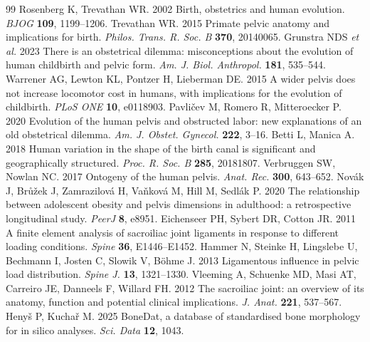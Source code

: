 \documentclass[openacc]{rsproca_new}
\begin{document}
\begin{thebibliography}{99}
 Rosenberg K, Trevathan WR. 2002 Birth, obstetrics and human evolution. \emph{BJOG} \textbf{109}, 1199--1206.
 Trevathan WR. 2015 Primate pelvic anatomy and implications for birth. \emph{Philos. Trans. R. Soc. B} \textbf{370}, 20140065.
 Grunstra NDS \emph{et al.} 2023 There is an obstetrical dilemma: misconceptions about the evolution of human childbirth and pelvic form. \emph{Am. J. Biol. Anthropol.} \textbf{181}, 535--544.
 Warrener AG, Lewton KL, Pontzer H, Lieberman DE. 2015 A wider pelvis does not increase locomotor cost in humans, with implications for the evolution of childbirth. \emph{PLoS ONE} \textbf{10}, e0118903.
 Pavli\v{c}ev M, Romero R, Mitteroecker P. 2020 Evolution of the human pelvis and obstructed labor: new explanations of an old obstetrical dilemma. \emph{Am. J. Obstet. Gynecol.} \textbf{222}, 3--16.
 Betti L, Manica A. 2018 Human variation in the shape of the birth canal is significant and geographically structured. \emph{Proc. R. Soc. B} \textbf{285}, 20181807.
 Verbruggen SW, Nowlan NC. 2017 Ontogeny of the human pelvis. \emph{Anat. Rec.} \textbf{300}, 643--652.
 Nov\'{a}k J, Br\r{u}\v{z}ek J, Zamrazilov\'{a} H, Va\v{n}kov\'{a} M, Hill M, Sedl\'{a}k P. 2020 The relationship between adolescent obesity and pelvis dimensions in adulthood: a retrospective longitudinal study. \emph{PeerJ} \textbf{8}, e8951.
 Eichenseer PH, Sybert DR, Cotton JR. 2011 A finite element analysis of sacroiliac joint ligaments in response to different loading conditions. \emph{Spine} \textbf{36}, E1446--E1452.
 Hammer N, Steinke H, Lingslebe U, Bechmann I, Josten C, Slowik V, B\"ohme J. 2013 Ligamentous influence in pelvic load distribution. \emph{Spine J.} \textbf{13}, 1321--1330.
 Vleeming A, Schuenke MD, Masi AT, Carreiro JE, Danneels F, Willard FH. 2012 The sacroiliac joint: an overview of its anatomy, function and potential clinical implications. \emph{J. Anat.} \textbf{221}, 537--567.
 Heny\v{s} P, Kucha\v{r} M. 2025 BoneDat, a database of standardised bone morphology for in silico analyses. \emph{Sci. Data} \textbf{12}, 1043.
\end{thebibliography}
\end{document}
